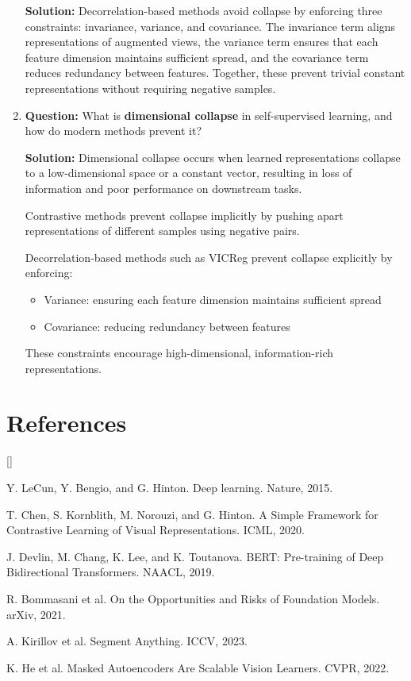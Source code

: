 \documentclass{article}
\def\beginrefs{\begin{list}
        {[\arabic{equation}]}{\usecounter{equation}
         \setlength{\leftmargin}{2.0truecm}\setlength{\labelsep}{0.4truecm}%
         \setlength{\labelwidth}{1.6truecm}}}
\def\endrefs{\end{list}}
\def\bibentry#1{\item[\hbox{[#1]}]}
\begin{document}
\begin{enumerate}
\textbf{Solution:}
Decorrelation-based methods avoid collapse by enforcing three constraints: invariance, variance, and covariance. The invariance term aligns representations of augmented views, the variance term ensures that each feature dimension maintains sufficient spread, and the covariance term reduces redundancy between features. Together, these prevent trivial constant representations without requiring negative samples.

\item \textbf{Question:}
What is \textbf{dimensional collapse} in self-supervised learning, and how do modern methods prevent it?

\textbf{Solution:}
Dimensional collapse occurs when learned representations collapse to a low-dimensional space or a constant vector, resulting in loss of information and poor performance on downstream tasks.

Contrastive methods prevent collapse implicitly by pushing apart representations of different samples using negative pairs.

Decorrelation-based methods such as VICReg prevent collapse explicitly by enforcing:
\begin{itemize}
\item Variance: ensuring each feature dimension maintains sufficient spread
\item Covariance: reducing redundancy between features
\end{itemize}

These constraints encourage high-dimensional, information-rich representations.

\end{enumerate}

\section{References}

\beginrefs

\bibentry{1}
Y. LeCun, Y. Bengio, and G. Hinton.
Deep learning.
Nature, 2015.

\bibentry{2}
T. Chen, S. Kornblith, M. Norouzi, and G. Hinton.
A Simple Framework for Contrastive Learning of Visual Representations.
ICML, 2020.

\bibentry{3}
J. Devlin, M. Chang, K. Lee, and K. Toutanova.
BERT: Pre-training of Deep Bidirectional Transformers.
NAACL, 2019.

\bibentry{4}
R. Bommasani et al.
On the Opportunities and Risks of Foundation Models.
arXiv, 2021.

\bibentry{5}
A. Kirillov et al.
Segment Anything.
ICCV, 2023.

\bibentry{6}
K. He et al.
Masked Autoencoders Are Scalable Vision Learners.
CVPR, 2022.

\endrefs
\end{document}
